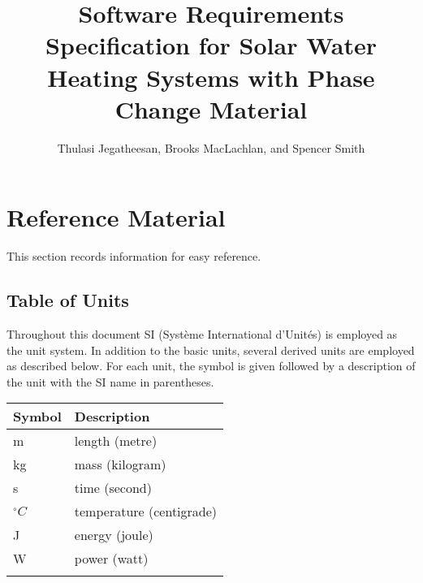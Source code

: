 \documentclass[12pt]{article}
\title{Software Requirements Specification for Solar Water Heating Systems with Phase Change Material}
\author{Thulasi Jegatheesan, Brooks MacLachlan, and Spencer Smith}
\begin{document}
\maketitle
\tableofcontents
\newpage
\section{Reference Material}
\label{Sec:RM}
This section records information for easy reference.
\subsection{Table of Units}
\label{Sec:ToU}
Throughout this document SI (Syst\`{e}me International d'Unit\'{e}s) is employed as the unit system. In addition to the basic units, several derived units are employed as described below. For each unit, the symbol is given followed by a description of the unit with the SI name in parentheses.
\begin{longtable*}{l l}
\toprule
Symbol & Description
\\
\midrule
m & length (metre)
\\
kg & mass (kilogram)
\\
s & time (second)
\\
${}^{\circ}C$ & temperature (centigrade)
\\
J & energy (joule)
\\
W & power (watt)
\\
\bottomrule
\label{Table:ToU}
\end{longtable*}
\end{document}
